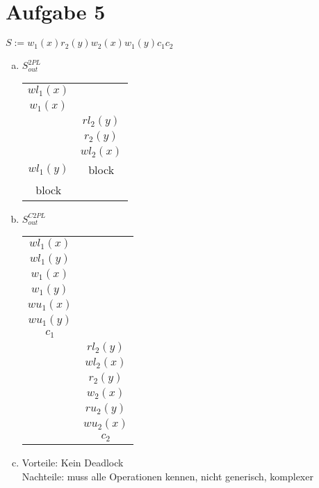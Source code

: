 \documentclass{scrartcl}
\begin{document}
\section*{Aufgabe 5}
$S := w_1(x)r_2(y)w_2(x)w_1(y)c_1c_2$
\begin{enumerate}[a)]
\item
$S^{2PL}_{out}$\\
\begin{tabular}{|c|c|}
\hline
 $wl_1(x)$ &  \\ 
 $w_1(x)$ &  \\ 
  & $rl_2(y)$ \\ 
  & $r_2(y)$ \\ 
  & $wl_2(x)$ \\ 
 $wl_1(y)$ & block \\ 
 block &  \\ 
\hline
\end{tabular} 

\item
$S^{C2PL}_{out}$\\
\begin{tabular}{|c|c|}
\hline
 $wl_1(x)$ &  \\ 
 $wl_1(y)$ &  \\ 
 $w_1(x)$ &  \\ 
 $w_1(y)$ &  \\ 
 $wu_1(x)$ &  \\
 $wu_1(y)$ &  \\
 $c_1$ &  \\ 
  & $rl_2(y)$ \\ 
  & $wl_2(x)$ \\ 
  & $r_2(y)$ \\ 
  & $w_2(x)$ \\
  & $ru_2(y)$ \\ 
  & $wu_2(x)$ \\
  & $c_2$ \\ 
\hline
\end{tabular} 

\item
Vorteile: Kein Deadlock\\
Nachteile: muss alle Operationen kennen, nicht generisch, komplexer\\
\end{enumerate}
\end{document}
